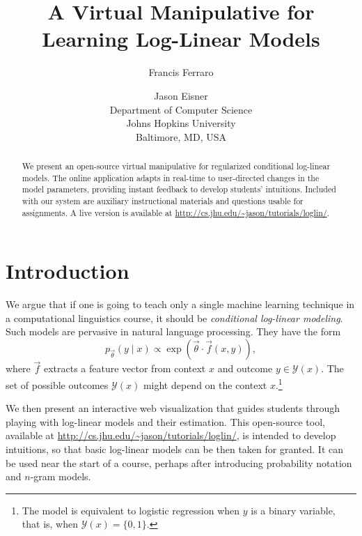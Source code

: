 \documentclass[11pt,letterpaper]{article}
\title{A Virtual Manipulative for Learning Log-Linear Models}
\author{
Francis Ferraro \and Jason Eisner\\
Department of Computer Science\\
Johns Hopkins University\\
Baltimore, MD, USA
}
\date{}
\newcommand{\WhereToFind}[0]{\url{http://cs.jhu.edu/~jason/tutorials/loglin/}}
\begin{document}
\maketitle

\begin{abstract}
We present an open-source virtual manipulative for regularized conditional 
log-linear models. The online application adapts in real-time to user-directed 
changes in the model parameters, providing instant feedback to develop 
students' intuitions. Included with our system are auxiliary instructional materials 
and questions usable for assignments. A live version is available at
\WhereToFind{}.
\end{abstract}

\section{Introduction}\label{sec:intro}
We argue that if one is going to teach only a single machine learning
technique in a computational linguistics course, it should be {\em
  conditional log-linear modeling}.  Such models are pervasive in
natural language processing.  They have the form
\begin{equation}\label{eqn:loglin}
p_{\vec{\theta}}(y \mid x) \propto \exp{\left(\vec{\theta} \cdot \vec{f}\left(x,y\right)\right)},
\end{equation}
where $\vec{f}$ extracts a feature vector from context $x$ and
outcome $y \in \mathcal{Y}(x)$.  The set of possible
outcomes $\mathcal{Y}(x)$ might depend on the context
$x$.\footnote{The model is equivalent to logistic regression
  when $y$ is a binary variable, that is, when $\mathcal{Y}(x)=\{0,1\}$.}

We then present an interactive web visualization that guides students
through playing with log-linear models and their estimation. This open-source 
tool, available at \WhereToFind{}, is intended to develop intuitions, so that basic
log-linear models can be then taken for granted.  It can be used near
the start of a course, perhaps after introducing probability notation
and $n$-gram models. 
\end{document}
